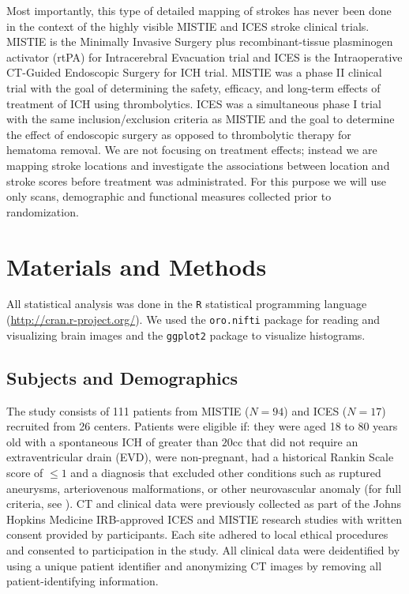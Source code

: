 \documentclass[10pt]{article}\usepackage[]{graphicx}\usepackage[]{color}
\begin{document}
Most importantly, this type of detailed mapping of strokes has never been done in the context of the highly visible MISTIE and ICES stroke clinical trials. MISTIE is the Minimally Invasive Surgery plus recombinant-tissue plasminogen activator (rtPA) for Intracerebral Evacuation trial and ICES is the Intraoperative CT-Guided Endoscopic Surgery for ICH trial.  MISTIE was a phase II clinical trial with the goal of determining the safety, efficacy, and long-term effects of treatment of ICH using thrombolytics.  ICES was a simultaneous phase I trial with the same inclusion/exclusion criteria as MISTIE and the goal to determine the effect of endoscopic surgery as opposed to thrombolytic therapy for hematoma removal.  
We are not focusing on treatment effects; instead we are mapping stroke locations and investigate the associations between location and stroke scores before treatment was administrated. For this purpose we will use only scans, demographic and functional measures collected prior to randomization. 

\section{Materials and Methods}

All statistical analysis was done in the \verb|R| statistical programming language (\url{http://cran.r-project.org/}).  We used the \verb|oro.nifti| package \citep{whitcher_working_2011} for reading and visualizing brain images and the \verb|ggplot2| package \citep{wickham_ggplot2:_2009} to visualize histograms.

\subsection{Subjects and Demographics}
The study consists of 111 patients from MISTIE ($N=94$) and ICES ($N = 17$) recruited from 26 centers.  Patients were eligible if: they were aged 18 to 80 years old with a spontaneous ICH of greater than $20$cc that did not require an extraventricular drain (EVD), were non-pregnant, had a historical Rankin Scale \citep{rankin_cerebral_1957, swieten_interobserver_1988} score of $≤ 1$ and a diagnosis that excluded other conditions such as ruptured aneurysms, arteriovenous malformations, or other neurovascular anomaly (for full criteria, see \citet{mould_minimally_2013}).  CT and clinical data were previously collected as part of the Johns Hopkins Medicine IRB-approved ICES and MISTIE research studies with written consent provided by participants.  Each site adhered to local ethical procedures and consented to participation in the study.  All clinical data were deidentified by using a unique patient identifier and anonymizing CT images by removing all patient-identifying information.  
\end{document}
